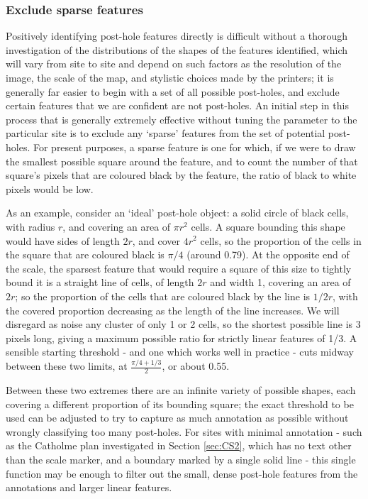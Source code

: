\documentclass[../../ArchStats.tex]{subfiles}
\begin{document}
\subsubsection{Exclude sparse features}
\label{sec:excl-sparse}

Positively identifying post-hole features directly is difficult without a thorough investigation of the distributions of the shapes of the features identified, which will vary from site to site and depend on such factors as the resolution of the image, the scale of the map, and stylistic choices made by the printers; it is generally far easier to begin with a set of all possible post-holes, and exclude certain features that we are confident are not post-holes. An initial step in this process that is generally extremely effective without tuning the parameter to the particular site is to exclude any `sparse' features from the set of potential post-holes. For present purposes, a sparse feature is one for which, if we were to draw the smallest possible square around the feature, and to count the number of that square's pixels that are coloured black by the feature, the ratio of black to white pixels would be low.


As an example, consider an `ideal' post-hole object: a solid circle of black cells, with radius $r$, and covering an area of $\pi r^2$ cells. A square bounding this shape would have sides of length $2r$, and cover $4r^2$ cells, so the proportion of the cells in the square that are coloured black is $\pi/4$ (around 0.79). At the opposite end of the scale, the sparsest feature that would require a square of this size to tightly bound it is a straight line of cells, of length $2r$ and width 1, covering an area of $2r$; so the proportion of the cells that are coloured black by the line is $1/2r$, with the covered proportion decreasing as the length of the line increases. We will disregard as noise any cluster of only 1 or 2 cells, so the shortest possible line is 3 pixels long, giving a maximum possible ratio for strictly linear features of 1/3. A sensible starting threshold - and one which works well in practice - cuts midway between these two limits, at $\frac{\pi/4+1/3}{2}$, or about 0.55. 

Between these two extremes there are an infinite variety of possible shapes, each covering a different proportion of its bounding square; the exact threshold to be used can be adjusted to try to capture as much annotation as possible without wrongly classifying too many post-holes. For sites with minimal annotation - such as the Catholme plan investigated in Section \ref{sec:CS2}, which has no text other than the scale marker, and a boundary marked by a single solid line - this single function may be enough to filter out the small, dense post-hole features from the annotations and larger linear features.
\end{document}
